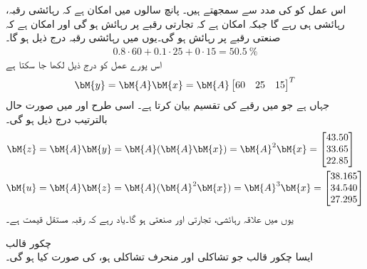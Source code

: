 اس عمل کو  کی مدد سے سمجھتے ہیں۔ پانچ سالوں میں  امکان ہے کہ رہائشی رقبہ، رہائشی ہی رہے گا جبکہ  امکان ہے کہ تجارتی رقبے پر رہائش ہو گی اور  امکان ہے کہ  صنعتی رقبے پر رہائش ہو گی۔یوں  میں رہائشی رقبہ درج ذیل ہو گا۔
\begin{align*}
0.8\cdot 60+0.1\cdot 25+0\cdot 15=\SI{50.5}{\percent}
\end{align*}
اس پورے عمل کو درج ذیل لکھا جا سکتا  ہے
\begin{align*}
\bM{y}=\bM{A}\bM{x}=\bM{A}\begin{bmatrix} 60&25&15 \end{bmatrix}^T
\end{align*}
جہاں   ہے جو  میں رقبے کی تقسیم بیان کرتا ہے۔ اسی طرح  اور  میں صورت حال بالترتیب درج ذیل ہو گی۔
\begin{align*}
\bM{z}&=\bM{A}\bM{y}=\bM{A}(\bM{A}\bM{x})=\bM{A}^2\bM{x}=\begin{bmatrix*}[l]43.50\\33.65\\22.85  \end{bmatrix*}\\
\bM{u}&=\bM{A}\bM{z}=\bM{A}(\bM{A}^2\bM{x})=\bM{A}^3\bM{x}=\begin{bmatrix*}[l]38.165\\34.540\\27.295  \end{bmatrix*}
\end{align*}
یوں  میں  علاقہ رہائشی،  تجارتی اور  صنعتی ہو گا۔یاد رہے کہ رقبہ مستقل قیمت ہے۔

\quad چکور قالب\\
ایسا چکور قالب جو تشاکلی اور منحرف تشاکلی ہو، کی صورت کیا ہو گی۔

